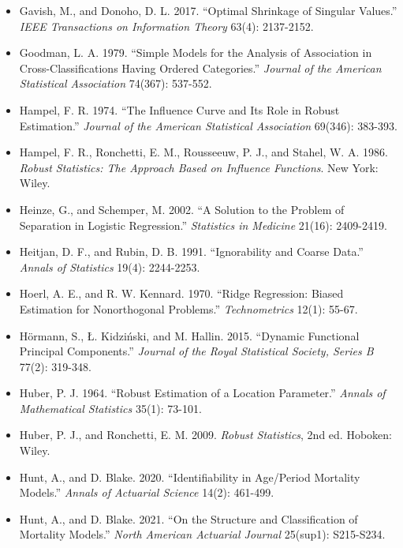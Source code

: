 \documentclass[UTF8, fontset=macnew, a4paper, 12pt]{ctexart}
\begin{document}
\begin{itemize}[leftmargin=2em, label={}, itemsep=3pt]
        Paths for Generalized Linear Models via Coordinate Descent.''
        \textit{Journal of Statistical Software} 33(1): 1-22.
  \item[] Gavish, M., and Donoho, D. L. 2017. ``Optimal Shrinkage of Singular Values.''
        \textit{IEEE Transactions on Information Theory} 63(4): 2137-2152.
  \item[] Goodman, L. A. 1979. ``Simple Models for the Analysis of Association in
        Cross-Classifications Having Ordered Categories.''
        \textit{Journal of the American Statistical Association} 74(367): 537-552.
  \item[] Hampel, F. R. 1974. ``The Influence Curve and Its Role in Robust Estimation.''
        \textit{Journal of the American Statistical Association} 69(346): 383-393.
  \item[] Hampel, F. R., Ronchetti, E. M., Rousseeuw, P. J., and Stahel, W. A. 1986.
        \textit{Robust Statistics: The Approach Based on Influence Functions}.
        New York: Wiley.
  \item[] Heinze, G., and Schemper, M. 2002. ``A Solution to the Problem of Separation
        in Logistic Regression.'' \textit{Statistics in Medicine} 21(16): 2409-2419.
  \item[] Heitjan, D. F., and Rubin, D. B. 1991. ``Ignorability and Coarse Data.''
        \textit{Annals of Statistics} 19(4): 2244-2253.
  \item[] Hoerl, A. E., and R. W. Kennard. 1970. ``Ridge Regression: Biased
        Estimation for Nonorthogonal Problems.''
        \textit{Technometrics} 12(1): 55-67.
  \item[] H\"ormann, S., \L. Kidzi\'nski, and M. Hallin. 2015. ``Dynamic
        Functional Principal Components.'' \textit{Journal of the Royal
        Statistical Society, Series B} 77(2): 319-348.
  \item[] Huber, P. J. 1964. ``Robust Estimation of a Location Parameter.''
        \textit{Annals of Mathematical Statistics} 35(1): 73-101.
  \item[] Huber, P. J., and Ronchetti, E. M. 2009. \textit{Robust Statistics},
        2nd ed. Hoboken: Wiley.
  \item[] Hunt, A., and D. Blake. 2020. ``Identifiability in Age/Period
        Mortality Models.'' \textit{Annals of Actuarial Science} 14(2): 461-499.
  \item[] Hunt, A., and D. Blake. 2021. ``On the Structure and Classification of
        Mortality Models.'' \textit{North American Actuarial Journal}
        25(sup1): S215-S234.

\end{itemize}
\end{document}
